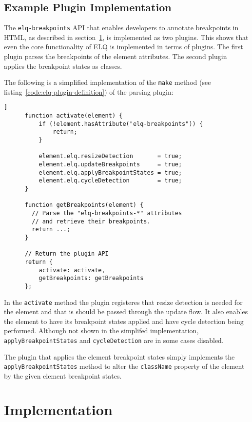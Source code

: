 \documentclass{acm_proc_article-sp}
\newcommand{\code}[1]{\texttt{#1}}
\newcommand{\elq}{ELQ}
\begin{document}
  \subsection{Example Plugin Implementation}
    The \code{elq-breakpoints} API that enables developers to annotate breakpoints in HTML, as described in section~\ref{}, is implemented as two plugins.
    This shows that even the core functionality of \elq{} is implemented in terms of plugins.
    The first plugin parses the breakpoints of the element attributes.
    The second plugin applies the breakpoint states as classes.

    The following is a simplified implementation of the \code{make} method (see listing~\ref{code:elq-plugin-definition}) of the parsing plugin:

    \begin{lstlisting}[gobble=6,caption={},captionpos=b,label={}]]
      function activate(element) {
          if (!element.hasAttribute("elq-breakpoints")) {
              return;
          }

          element.elq.resizeDetection       = true;
          element.elq.updateBreakpoints     = true;
          element.elq.applyBreakpointStates = true;
          element.elq.cycleDetection        = true;
      }

      function getBreakpoints(element) {
        // Parse the "elq-breakpoints-*" attributes
        // and retrieve their breakpoints.
        return ...;
      }

      // Return the plugin API
      return {
          activate: activate,
          getBreakpoints: getBreakpoints
      };
    \end{lstlisting}

    In the \code{activate} method the plugin registeres that resize detection is needed for the element and that is should be passed through the update flow.
    It also enables the element to have its breakpoint states applied and have cycle detection being performed.
    Although not shown in the simplifed implementation, \code{applyBreakpointStates} and \code{cycleDetection} are in some cases disabled.

    The plugin that applies the element breakpoint states simply implements the \code{applyBreakpointStates} method to alter the \code{className} property of the element by the given element breakpoint states.

\section{Implementation}
\end{document}

